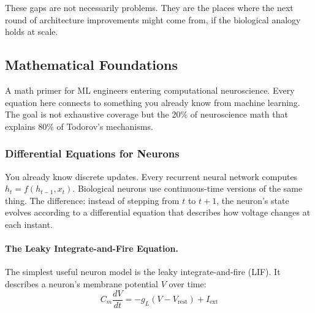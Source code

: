 \documentclass[11pt,a4paper]{article}
\begin{document}
These gaps are not necessarily problems. They are the places where the next round of architecture improvements might come from, if the biological analogy holds at scale.


\subsection{Mathematical Foundations}

A math primer for ML engineers entering computational neuroscience. Every equation here connects to something you already know from machine learning. The goal is not exhaustive coverage but the 20\% of neuroscience math that explains 80\% of Todorov's mechanisms.

\subsubsection{Differential Equations for Neurons}

You already know discrete updates. Every recurrent neural network computes $h_t = f(h_{t-1}, x_t)$. Biological neurons use continuous-time versions of the same thing. The difference: instead of stepping from $t$ to $t+1$, the neuron's state evolves according to a differential equation that describes how voltage changes at each instant.

\paragraph{The Leaky Integrate-and-Fire Equation.}

The simplest useful neuron model is the leaky integrate-and-fire (LIF). It describes a neuron's membrane potential $V$ over time:
\[
  C_m \frac{dV}{dt} = -g_L(V - V_{\mathrm{rest}}) + I_{\mathrm{ext}}
\]
\end{document}
